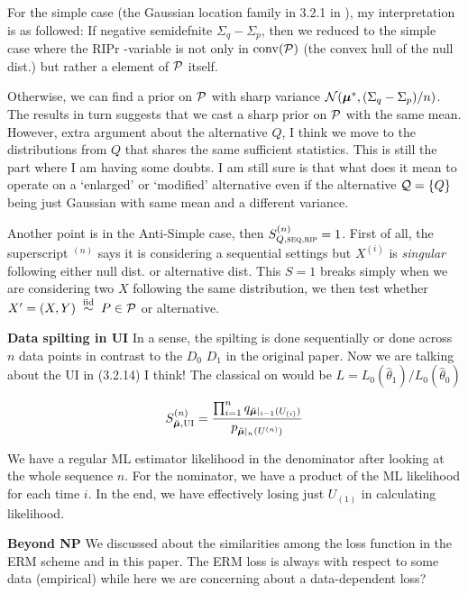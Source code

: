For the simple case (the Gaussian location family in 3.2.1 in \cite{haoEvaluesAnytimevalidInference2025}),
my interpretation is as followed:
If negative semidefnite $\Sigma_q-\Sigma_p$, then we reduced to the simple case where the RIPr \E-variable is not only
in $\mathrm{conv}(\mathcal{P})$ (the convex hull of the null dist.) but rather a element of $\mathcal{P}$ itself.

Otherwise, we can find a prior on $\mathcal{P}$ with sharp variance $\mathcal{N}(\bm{\mu}^*, (\Sigma_q-\Sigma_p)/n)$.
The results in turn suggests that we cast a sharp prior on $\mathcal{P}$ with the same mean.
However, extra argument about the alternative $Q$, I think we move to the distributions from $Q$
that shares the same sufficient statistics.
This is still the part where I am having some doubts.
I am still sure is that what does it mean to operate on a `enlarged' or `modified'
alternative even if the alternative $\mathcal{Q}=\{Q\}$ being just Gaussian with same mean and a different variance.

Another point is in the Anti-Simple case, then $S_{Q,\textsc{seq,rip}}^{(n)} =1$.
First of all, the superscript $^{(n)}$ says it is considering a sequential settings
but $X^{(i)}$ is \emph{singular} following either null dist. or alternative dist.
This $S=1$ breaks simply when we are considering two $X$ following the same distribution,
we then test whether $X' = (X, Y) \; \overset{\mathrm{iid}}{\sim} \; P \in \mathcal{P}$ or alternative.

\textbf{Data spilting in UI} \quad In a sense, the spilting is done sequentially or done across $n$
data points in contrast to the $D_0$ $D_1$ in the original paper. Now we are talking about the UI in (3.2.14)
I think! The classical on would be $L = L_0(\hat{\theta}_1)/L_0(\hat{\theta}_0)$

\begin{align*}
	S_{\breve{\bm{\mu}},\textsc{UI}}^{(n)} =
	\frac{\prod_{i=1}^n q_{\breve{\bm{\mu}}|_{i-1}(U_{(i)})}}
	{p_{\breve{\bm{\mu}}|_n(U^{(n)})}}
\end{align*}

We have a regular ML estimator likelihood in the denominator after looking at the whole sequence $n$.
For the nominator, we have a product of the ML likelihood for each time $i$.
In the end, we have effectively losing just $U_{(1)}$ in calculating likelihood.

\textbf{Beyond NP} \quad We discussed about the similarities among the loss function in the ERM scheme
and in this paper. The ERM loss is always with respect to some data (empirical) while
here we are concerning about a data-dependent loss?

